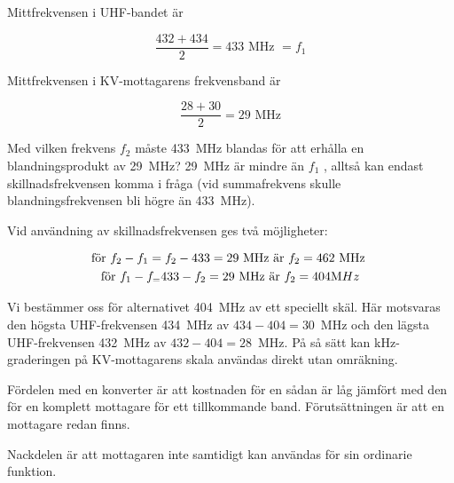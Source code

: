 Mittfrekvensen i UHF-bandet är

\[\frac{432+434}{2} = 433\text{ MHz } = f_1\]

Mittfrekvensen i KV-mottagarens frekvensband är

\[\frac{28 + 30}{2} = 29\text{ MHz}\]

Med vilken frekvens \(f_2\) måste 433~MHz blandas för att erhålla en
blandningsprodukt av 29~MHz?
29~MHz är mindre än \(f_1\) , alltså kan endast skillnadsfrekvensen komma i
fråga (vid summafrekvens skulle blandningsfrekvensen bli högre än 433~MHz).

Vid användning av skillnadsfrekvensen ges två möjligheter:

\begin{gather*}
  \text{för }f_2 - f_1 = f_2 - 433 = 29\text{ MHz är }f_2 = 462\text{ MHz} \\
  \text{för }f_1 - f_ = 433 - f_2 = 29\text{ MHz är }f_2 = 404{\text MHz} \\
\end{gather*}

Vi bestämmer oss för alternativet 404~MHz av ett speciellt skäl.
Här motsvaras den högsta UHF-frekvensen 434~MHz av \(434 - 404 = 30\)~MHz
och den lägsta UHF-frekvensen 432~MHz av \(432 - 404 = 28\)~MHz.
På så sätt kan kHz-graderingen på KV-mottagarens skala användas direkt utan
omräkning.

Fördelen med en konverter är att kostnaden för en sådan är låg jämfört
med den för en komplett mottagare för ett tillkommande band.
Förutsättningen är att en mottagare redan finns.

Nackdelen är att mottagaren inte samtidigt kan användas för sin
ordinarie funktion.
